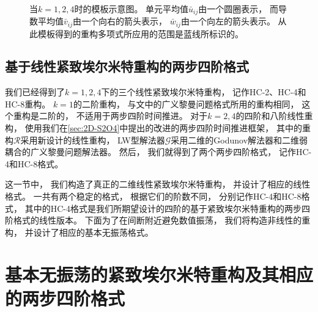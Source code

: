 \begin{figure}[htbp]
  \\
  \caption{当$k=1,2,4$时的模板示意图。
    单元平均值$\bar u_{ij}$由一个圆圈表示，
    而导数平均值$\bar v_{ij}$由一个向右的箭头表示，
    $\bar w_{ij}$由一个向左的箭头表示。
    从此模板得到的重构多项式所应用的范围是蓝线所标识的。
  }
  \label{fig:stencil}
\end{figure}



\subsection{基于线性紧致埃尔米特重构的两步四阶格式}

我们已经得到了$k=1,2,4$下的三个线性紧致埃尔米特重构，
记作HC-2、HC-4和HC-8重构。
$k=1$的二阶重构，
与文\cite{Book-Matania}中的广义黎曼问题格式所用的重构相同，
这个重构是二阶的，
不适用于两步四阶时间推进。
对于$k=2,4$的四阶和八阶线性重构，
使用我们在\cref{sec:2D-S2O4}中提出的改进的两步四阶时间推进框架，
其中的重构$\mathcal{R}$采用新设计的线性重构，
LW型解法器$\mathcal{G}$采用二维的Godunov解法器和二维弱耦合的广义黎曼问题解法器。
然后，
我们就得到了两个两步四阶格式，
记作HC-4和HC-8格式。

\vspace{\baselineskip} %
这一节中，
我们构造了真正的二维线性紧致埃尔米特重构，
并设计了相应的线性格式。
一共有两个稳定的格式，
根据它们的阶数不同，
分别记作HC-4和HC-8格式，
其中的HC-4格式是我们所期望设计的四阶的基于紧致埃尔米特重构的两步四阶格式的线性版本。
下面为了在间断附近避免数值振荡，
我们将构造非线性的重构，
并设计了相应的基本无振荡格式。

\section{基本无振荡的紧致埃尔米特重构及其相应的两步四阶格式}

